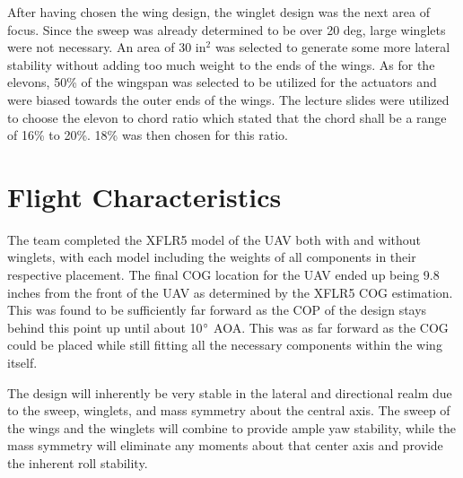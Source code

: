     After having chosen the wing design, the winglet design was the next area of focus. Since the sweep was already determined to be over 20 deg, large winglets were not necessary. An area of 30 in$^2$ was selected to generate some more lateral stability without adding too much weight to the ends of the wings. As for the elevons, 50\% of the wingspan was selected to be utilized for the actuators and were biased towards the outer ends of the wings. The lecture slides were utilized to choose the elevon to chord ratio which stated that the chord shall be a range of 16\% to 20\%. 18\% was then chosen for this ratio.


\section{Flight Characteristics}

The team completed the XFLR5 model of the UAV both with and without winglets, with each model including the weights of all components in their respective placement. The final COG location for the UAV ended up being 9.8 inches from the front of the UAV as determined by the XFLR5 COG estimation. This was found to be sufficiently far forward as the COP of the design stays behind this point up until about 10$\degree$ AOA. This was as far forward as the COG could be placed while still fitting all the necessary components within the wing itself. 

The design will inherently be very stable in the lateral and directional realm due to the sweep, winglets, and mass symmetry about the central axis. The sweep of the wings and the winglets will combine to provide ample yaw stability, while the mass symmetry will eliminate any moments about that center axis and provide the inherent roll stability.

